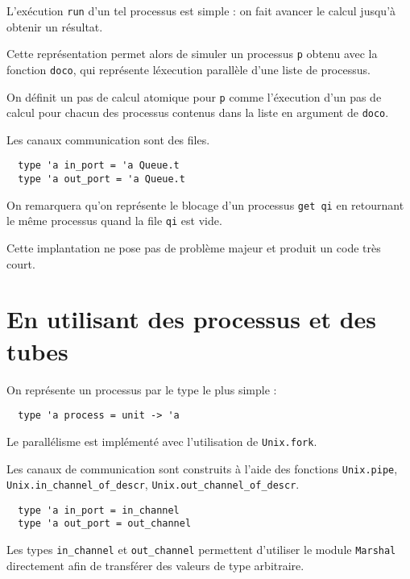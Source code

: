 \documentclass[11pt]{article}
\begin{document}
L'ex\'ecution {\tt run} d'un tel processus est simple :
on fait avancer le calcul jusqu'\`a obtenir un r\'esultat.

\smallskip

Cette repr\'esentation permet alors de simuler un processus {\tt p}
obtenu avec la fonction {\tt doco}, qui repr\'esente l\'execution
parall\`ele d'une liste de processus.

On d\'efinit un pas de calcul atomique pour {\tt p}
comme l'\'execution d'un pas de calcul pour chacun des processus
contenus dans la liste en argument de {\tt doco}.

\smallskip

Les canaux communication sont des files.

\begin{lstlisting}
  type 'a in_port = 'a Queue.t
  type 'a out_port = 'a Queue.t
\end{lstlisting}

On remarquera qu'on repr\'esente le blocage d'un processus {\tt get qi}
en retournant le m\^eme processus quand la file {\tt qi} est vide.

\smallskip

Cette implantation ne pose pas de probl\`eme majeur
et produit un code tr\`es court.

\section{En utilisant des processus et des tubes}

On repr\'esente un processus par le type le plus simple :

\begin{lstlisting}
  type 'a process = unit -> 'a
\end{lstlisting}

Le parall\'elisme est impl\'ement\'e avec l'utilisation de {\tt Unix.fork}.

\smallskip

Les canaux de communication sont construits \`a l'aide des fonctions
{\tt Unix.pipe},
{\tt Unix.in\_channel\_of\_descr}, {\tt Unix.out\_channel\_of\_descr}.

\begin{lstlisting}
  type 'a in_port = in_channel
  type 'a out_port = out_channel
\end{lstlisting}

Les types {\tt in\_channel} et {\tt out\_channel} permettent d'utiliser
le module {\tt Marshal} directement afin de transf\'erer des valeurs
de type arbitraire.
\end{document}
